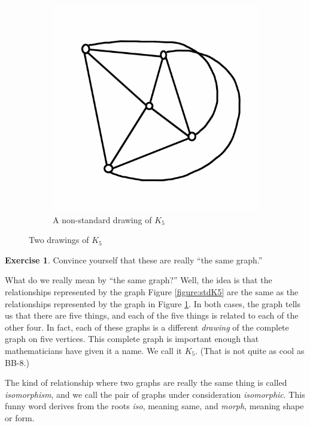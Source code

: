 \documentclass[12pt,letterpaper]{article}
\theoremstyle{definition}
\newtheorem{exercise}[question]{Exercise}
\begin{document}
\begin{figure}[h]
\begin{subfigure}[b]{0.4\textwidth}
\includegraphics[width=\textwidth]{images/altk5.png}
\caption{A non-standard drawing of $K_5$}
\label{figure:altK5}
\end{subfigure}
\caption{Two drawings of $K_5$}
\label{figure:K5s}
\end{figure}

\begin{exercise}
Convince yourself that these are really ``the same graph.''
\end{exercise}

What do we really mean by ``the same graph?'' Well, the idea is that the relationships represented by the graph
Figure \ref{figure:stdK5} are the same as the relationships represented by the graph in Figure \ref{figure:altK5}.
In both cases, the graph tells us that there are five things, and each of the five things is related to each of
the other four. In fact, each of these graphs is a different \emph{drawing} of the complete graph on five
vertices. This complete graph is important enough that mathematicians have given it a name. We call it
$K_5$. (That is not quite as cool as BB-8.)

The kind of relationship where two graphs are really the same thing is called \emph{isomorphism}, and
we call the pair of graphs under consideration \emph{isomorphic}. This funny word derives from the
roots \emph{iso}, meaning same, and \emph{morph}, meaning shape or form.
\end{document}
